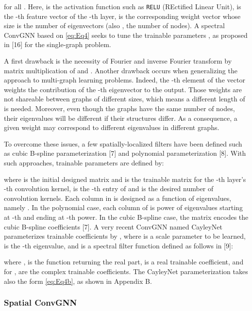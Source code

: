 \documentclass{article}
\begin{document}
for all . Here,  is the activation function such as \verb|RELU| (REctified Linear Unit),  is the -th feature vector of the -th layer,  
is the corresponding  weight vector whose size is the number
of eigenvectors (also , the number of nodes). A spectral ConvGNN based on \eqref{eq:Eq4} seeks to tune the trainable parameters , as proposed in [16] for the single-graph problem. 

A first drawback is the necessity of Fourier and inverse Fourier transform by matrix multiplication of  and . Another drawback occurs when generalizing the approach to multi-graph learning problems. Indeed, the -th element of the vector   weights the contribution of the -th  eigenvector to the output. Those weights are not shareable between graphs of different sizes, which means a different length of  is needed. Moreover, even though the graphs have the same number of nodes, their eigenvalues will be different if their structures differ. As a consequence, a given weight  may correspond to different eigenvalues in different graphs. 

To overcome these issues, a few spatially-localized filters have been defined such as cubic B-spline parameterization [7] and polynomial parameterization [8]. With such approaches, trainable parameters are defined by:

where  is the initial designed matrix and  is the trainable matrix for the -th layer's -th convolution kernel,  is the -th entry of  and  is the desired number of convolution kernels. Each column in  is designed as a function of eigenvalues, namely .
In the polynomial case, each column of  is power of eigenvalues starting at -th and ending at -th power. In the cubic B-spline case, the  matrix encodes the cubic B-spline coefficients [7].   
A very recent ConvGNN named CayleyNet parameterizes trainable coefficients by , where  is a scale parameter to be learned,  is the -th eigenvalue, and   is a spectral filter function defined as follows in [9]:

\noindent where ,  is the function returning the real part,  is a real trainable coefficient, and for ,  are the complex trainable coefficients. The CayleyNet parameterization takes also the form \eqref{eq:Eq4b}, as shown in Appendix B.

\subsubsection{Spatial ConvGNN}
\end{document}

